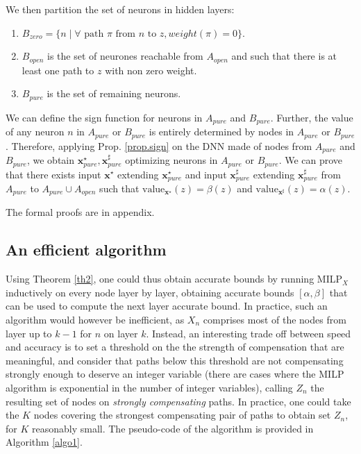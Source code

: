 \documentclass{llncs}
\newcommand{\vx}{\boldsymbol{x}}
\newcommand{\val}{{\textrm{value}}}
\begin{document}
We then partition the set of neurons in hidden layers: 
\begin{enumerate}
	\item $B_{zero}= \{n \mid \forall \text{ path $\pi$ from $n$ to } z, weight(\pi)=0\}$.
	\item $B_{open}$ is the set of neurones reachable from $A_{open}$ and such that there is at least one path to $z$ with non zero weight.
	\item $B_{pure}$ is the set of remaining neurons.
\end{enumerate}

We can define the sign function for neurons in $A_{pure}$ and $B_{pure}$.
Further, the value of any neuron $n$ in $A_{pure}$ or $B_{pure}$ is entirely determined by 
nodes in $A_{pure}$ or $B_{pure}$. Therefore, applying Prop. \ref{prop.sign} on the DNN
made of nodes from $A_{pure}$ and $B_{pure}$, we obtain 
$\vx_{pure}^\star,\vx_{pure}^\sharp$ optimizing neurons in $A_{pure}$ or $B_{pure}$.
We can prove that there exists input 
$\vx^\star$ extending $\vx_{pure}^\star$
and input $\vx_{pure}^\sharp$ extending $\vx_{pure}^\sharp$
from $A_{pure}$ to $A_{pure} \cup A_{open}$ such that 
$\val_{\vx^\star}(z)=\beta(z)$ and $\val_{\vx^\sharp}(z)=\alpha(z)$.

The formal proofs are in appendix.


\subsection{An efficient algorithm}

Using Theorem \ref{th2}, one could thus obtain accurate bounds by running MILP$_{X}$ inductively on every node layer by layer, obtaining accurate bounds $[\alpha,\beta]$ that can be used to compute the next layer accurate bound. In practice, such an algorithm would however be inefficient, as $X_n$ comprises most of the nodes from layer up to $k-1$ for $n$ on layer $k$. Instead, an interesting trade off between speed and accuracy is to set a threshold on the the strength of compensation that are meaningful, and consider that paths below this threshold are not compensating strongly enough to deserve an integer variable (there are cases where the MILP algorithm is exponential in the number of integer variables), calling $Z_n$ the resulting set of nodes on {\em strongly compensating} paths. In practice, one could take the $K$ nodes covering the strongest compensating pair of paths to obtain set $Z_n$, for $K$ reasonably small. 
The pseudo-code of the algorithm is provided in Algorithm \ref{algo1}.
\end{document}
